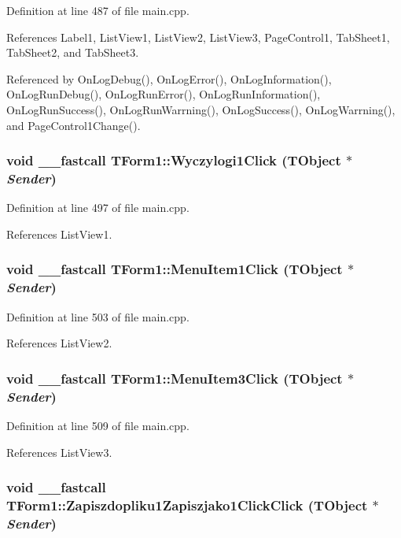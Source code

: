 Definition at line 487 of file main.cpp.

References Label1, ListView1, ListView2, ListView3, PageControl1, TabSheet1, TabSheet2, and TabSheet3.

Referenced by OnLogDebug(), OnLogError(), OnLogInformation(), OnLogRunDebug(), OnLogRunError(), OnLogRunInformation(), OnLogRunSuccess(), OnLogRunWarrning(), OnLogSuccess(), OnLogWarrning(), and PageControl1Change().\hypertarget{classTForm1_1c7229a551faa6b9095eb523b0843122}{
\subsubsection[Wyczylogi1Click]{\setlength{\rightskip}{0pt plus 5cm}void \_\-\_\-fastcall TForm1::Wyczylogi1Click (TObject $\ast$ {\em Sender})}}
\label{classTForm1_1c7229a551faa6b9095eb523b0843122}




Definition at line 497 of file main.cpp.

References ListView1.\hypertarget{classTForm1_2f1df2a24662cbe737ae88633dbdcbc2}{
\subsubsection[MenuItem1Click]{\setlength{\rightskip}{0pt plus 5cm}void \_\-\_\-fastcall TForm1::MenuItem1Click (TObject $\ast$ {\em Sender})}}
\label{classTForm1_2f1df2a24662cbe737ae88633dbdcbc2}




Definition at line 503 of file main.cpp.

References ListView2.\hypertarget{classTForm1_c43ab1208fdd1700242479091fa54bfa}{
\subsubsection[MenuItem3Click]{\setlength{\rightskip}{0pt plus 5cm}void \_\-\_\-fastcall TForm1::MenuItem3Click (TObject $\ast$ {\em Sender})}}
\label{classTForm1_c43ab1208fdd1700242479091fa54bfa}




Definition at line 509 of file main.cpp.

References ListView3.\hypertarget{classTForm1_aa65d93be5f8ead0aa96f29accddb0a8}{
\subsubsection[Zapiszdopliku1Zapiszjako1ClickClick]{\setlength{\rightskip}{0pt plus 5cm}void \_\-\_\-fastcall TForm1::Zapiszdopliku1Zapiszjako1ClickClick (TObject $\ast$ {\em Sender})}}
\label{classTForm1_aa65d93be5f8ead0aa96f29accddb0a8}




